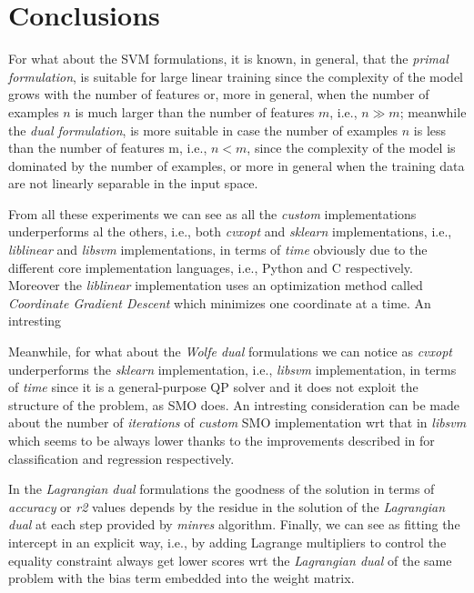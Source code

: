 \section{Conclusions}

For what about the SVM formulations, it is known, in general, that the \emph{primal formulation}, is suitable for large linear training since the complexity of the model grows with the number of features or, more in general, when the number of examples $n$ is much larger than the number of features $m$, i.e., $n \gg m$; meanwhile the \emph{dual formulation}, is more suitable in case the number of examples $n$ is less than the number of features m, i.e., $n < m$, since the complexity of the model is dominated by the number of examples, or more in general when the training data are not linearly separable in the input space.

\bigskip

From all these experiments we can see as all the \emph{custom} implementations underperforms al the others, i.e., both \emph{cvxopt} \cite{vandenberghe2010cvxopt} and \emph{sklearn} implementations, i.e., \emph{liblinear} \cite{fan2008liblinear} and \emph{libsvm} \cite{chang2011libsvm} implementations, in terms of \emph{time} obviously due to the different core implementation languages, i.e., Python and C respectively. Moreover the \emph{liblinear} \cite{fan2008liblinear} implementation uses an optimization method called \emph{Coordinate Gradient Descent} which minimizes one coordinate at a time. An intresting 

Meanwhile, for what about the \emph{Wolfe dual} formulations we can notice as \emph{cvxopt} \cite{vandenberghe2010cvxopt} underperforms the \emph{sklearn} implementation, i.e., \emph{libsvm} \cite{chang2011libsvm} implementation, in terms of \emph{time} since it is a general-purpose QP solver and it does not exploit the structure of the problem, as SMO does. An intresting consideration can be made about the number of \emph{iterations} of \emph{custom} SMO implementation wrt that in \emph{libsvm} which seems to be always lower thanks to the improvements described in \cite{keerthi2001improvements, shevade1999improvements} for classification and regression respectively.

In the \emph{Lagrangian dual} formulations the goodness of the solution in terms of \emph{accuracy} or \emph{r2} values depends by the residue in the solution of the \emph{Lagrangian dual} at each step provided by \emph{minres} algorithm. Finally, we can see as fitting the intercept in an explicit way, i.e., by adding Lagrange multipliers to control the equality constraint always get lower scores wrt the \emph{Lagrangian dual} of the same problem with the bias term embedded into the weight matrix.

